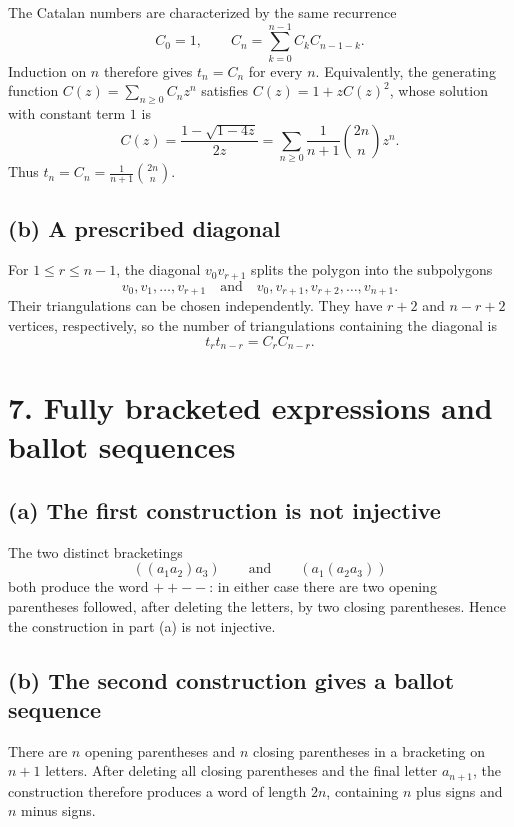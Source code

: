 \documentclass[11pt]{article}
\begin{document}
The Catalan numbers are characterized by the same recurrence
\[
    C_0=1,\qquad C_n=\sum_{k=0}^{n-1}C_kC_{n-1-k}.
\]
Induction on \(n\) therefore gives \(t_n=C_n\) for every \(n\). Equivalently,
the generating function \(C(z)=\sum_{n\geq0}C_nz^n\) satisfies
\(C(z)=1+zC(z)^2\), whose solution with constant term \(1\) is
\[
    C(z)=\frac{1-\sqrt{1-4z}}{2z}
       =\sum_{n\geq0}\frac{1}{n+1}\binom{2n}{n}z^n.
\]
Thus \(t_n=C_n=\frac{1}{n+1}\binom{2n}{n}\).

\subsection*{(b) A prescribed diagonal}

For \(1\leq r\leq n-1\), the diagonal \(v_0v_{r+1}\) splits the polygon into
the subpolygons
\[
    v_0,v_1,\ldots,v_{r+1}
    \quad\text{and}\quad
    v_0,v_{r+1},v_{r+2},\ldots,v_{n+1}.
\]
Their triangulations can be chosen independently. They have \(r+2\) and
\(n-r+2\) vertices, respectively, so the number of triangulations containing
the diagonal is
\[
\boxed{t_rt_{n-r}=C_rC_{n-r}.}
\]

\section*{7. Fully bracketed expressions and ballot sequences}

\subsection*{(a) The first construction is not injective}

The two distinct bracketings
\[
    ((a_1a_2)a_3)
    \qquad\text{and}\qquad
    (a_1(a_2a_3))
\]
both produce the word \(++--\): in either case there are two opening
parentheses followed, after deleting the letters, by two closing parentheses. Hence the construction in part (a) is not injective.

\subsection*{(b) The second construction gives a ballot sequence}

There are \(n\) opening parentheses and \(n\) closing parentheses in a
bracketing on \(n+1\) letters. After deleting all closing parentheses and
the final letter \(a_{n+1}\), the construction therefore produces a word of
length \(2n\), containing \(n\) plus signs and \(n\) minus signs.
\end{document}
